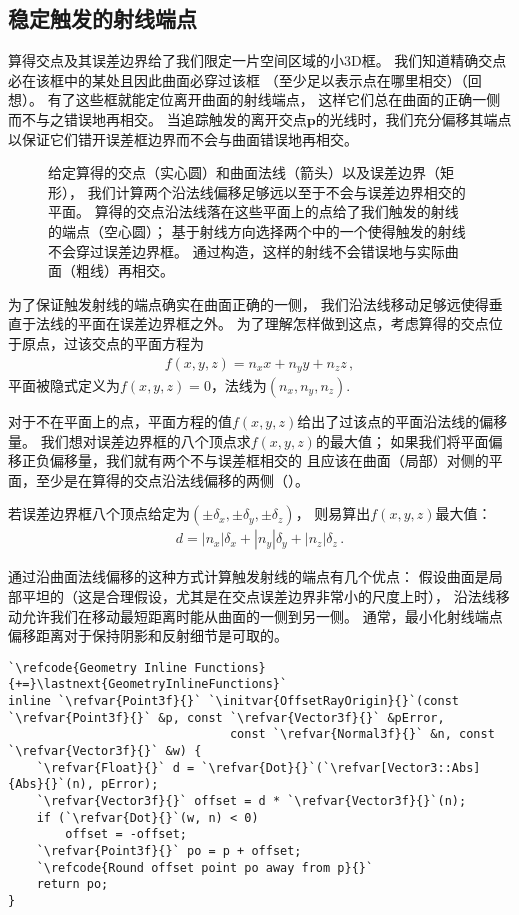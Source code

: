\subsection{稳定触发的射线端点}\label{sub:稳定触发的射线端点}
算得交点及其误差边界给了我们限定一片空间区域的小3D框。
我们知道精确交点必在该框中的某处且因此曲面必穿过该框
（至少足以表示点在哪里相交）（回想）。
有了这些框就能定位离开曲面的射线端点，
这样它们总在曲面的正确一侧而不与之错误地再相交。
当追踪触发的离开交点$\bm p$的光线时，我们充分偏移其端点
以保证它们错开误差框边界而不会与曲面错误地再相交。
\begin{figure}[htbp]
    \centering
    \caption{给定算得的交点（实心圆）和曲面法线（箭头）以及误差边界（矩形），
        我们计算两个沿法线偏移足够远以至于不会与误差边界相交的平面。
        算得的交点沿法线落在这些平面上的点给了我们触发的射线的端点（空心圆）；
        基于射线方向选择两个中的一个使得触发的射线不会穿过误差边界框。
        通过构造，这样的射线不会错误地与实际曲面（粗线）再相交。}
    \label{fig:3.45}
\end{figure}

为了保证触发射线的端点确实在曲面正确的一侧，
我们沿法线移动足够远使得垂直于法线的平面在误差边界框之外。
为了理解怎样做到这点，考虑算得的交点位于原点，过该交点的平面方程为
\begin{align*}
    f(x,y,z)=n_xx+n_yy+n_zz\, ,
\end{align*}
平面被隐式定义为$f(x,y,z)=0$，法线为$(n_x,n_y,n_z)$.

对于不在平面上的点，平面方程的值$f(x,y,z)$给出了过该点的平面沿法线的偏移量。
我们想对误差边界框的八个顶点求$f(x,y,z)$的最大值；
如果我们将平面偏移正负偏移量，我们就有两个不与误差框相交的
且应该在曲面（局部）对侧的平面，至少是在算得的交点沿法线偏移的两侧（）。

若误差边界框八个顶点给定为$(\pm\delta_x,\pm\delta_y,\pm\delta_z)$，
则易算出$f(x,y,z)$最大值：
\begin{align*}
    d=|n_x|\delta_x+|n_y|\delta_y+|n_z|\delta_z\, .
\end{align*}

通过沿曲面法线偏移的这种方式计算触发射线的端点有几个优点：
假设曲面是局部平坦的（这是合理假设，尤其是在交点误差边界非常小的尺度上时），
沿法线移动允许我们在移动最短距离时能从曲面的一侧到另一侧。
通常，最小化射线端点偏移距离对于保持阴影和反射细节是可取的。
\begin{lstlisting}
`\refcode{Geometry Inline Functions}{+=}\lastnext{GeometryInlineFunctions}`
inline `\refvar{Point3f}{}` `\initvar{OffsetRayOrigin}{}`(const `\refvar{Point3f}{}` &p, const `\refvar{Vector3f}{}` &pError,
                               const `\refvar{Normal3f}{}` &n, const `\refvar{Vector3f}{}` &w) {
    `\refvar{Float}{}` d = `\refvar{Dot}{}`(`\refvar[Vector3::Abs]{Abs}{}`(n), pError);
    `\refvar{Vector3f}{}` offset = d * `\refvar{Vector3f}{}`(n);
    if (`\refvar{Dot}{}`(w, n) < 0)
        offset = -offset;
    `\refvar{Point3f}{}` po = p + offset;
    `\refcode{Round offset point po away from p}{}`
    return po;
}
\end{lstlisting}

